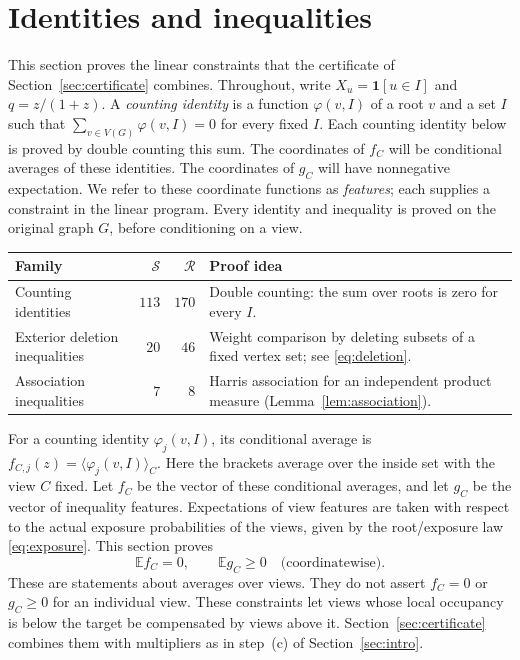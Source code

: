 \documentclass[11pt]{article}
\newcommand{\E}{\mathbb E}\newcommand{\Prob}{\mathbb P}
\newcommand{\ind}{\mathbf1}\newcommand{\F}{\mathcal F}\newcommand{\V}{\mathcal V}
\begin{document}
\section{Identities and inequalities}\label{sec:rows}
This section proves the linear constraints that the certificate of Section~\ref{sec:certificate} combines. Throughout, write $X_u=\ind[u\in I]$ and $q=z/(1+z)$. A \emph{counting identity} is a function $\varphi(v,I)$ of a root $v$ and a set $I$ such that $\sum_{v\in V(G)}\varphi(v,I)=0$ for every fixed $I$. Each counting identity below is proved by double counting this sum. The coordinates of $f_C$ will be conditional averages of these identities. The coordinates of $g_C$ will have nonnegative expectation. We refer to these coordinate functions as \emph{features}; each supplies a constraint in the linear program. Every identity and inequality is proved on the original graph $G$, before conditioning on a view.
\begin{center}\small
\setlength{\tabcolsep}{4pt}
\begin{tabular}{>{\raggedright\arraybackslash}p{3.0cm}rr>{\raggedright\arraybackslash}p{5.4cm}}\toprule
Family&$\mathcal S$&$\mathcal R$&Proof idea\\\midrule
Counting identities&$113$&$170$&Double counting: the sum over roots is zero for every $I$.\\
Exterior deletion inequalities&$20$&$46$&Weight comparison by deleting subsets of a fixed vertex set; see \eqref{eq:deletion}.\\
Association inequalities&$7$&$8$&Harris association for an independent product measure (Lemma~\ref{lem:association}).\\\bottomrule
\end{tabular}
\end{center}

For a counting identity $\varphi_j(v,I)$, its conditional average is $f_{C,j}(z)=\langle\varphi_j(v,I)\rangle_C$. Here the brackets average over the inside set with the view $C$ fixed. Let $f_C$ be the vector of these conditional averages, and let $g_C$ be the vector of inequality features. Expectations of view features are taken with respect to the actual exposure probabilities of the views, given by the root/exposure law \eqref{eq:exposure}. This section proves
\[
 \E f_C=0,\qquad \E g_C\ge0\quad\text{(coordinatewise)}.
\]
These are statements about averages over views. They do not assert $f_C=0$ or $g_C\ge0$ for an individual view. These constraints let views whose local occupancy is below the target be compensated by views above it. Section~\ref{sec:certificate} combines them with multipliers as in step~(c) of Section~\ref{sec:intro}.
\end{document}
